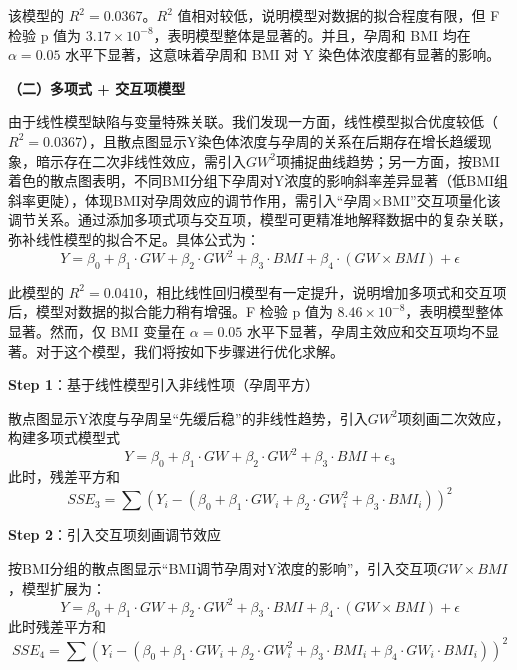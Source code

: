 \documentclass[withoutpreface,bwprint]{cumcmthesis} %
\begin{document}
该模型的 $R^2 = 0.0367$。$R^2$ 值相对较低，说明模型对数据的拟合程度有限，但 F 检验 p 值为 $3.17 \times 10^{-8}$，表明模型整体是显著的。并且，孕周和 BMI 均在 $\alpha = 0.05$ 水平下显著，这意味着孕周和 BMI 对 Y 染色体浓度都有显著的影响。

\textbf{（二）多项式 + 交互项模型}

由于线性模型缺陷与变量特殊关联。我们发现一方面，线性模型拟合优度较低（$R^2=0.0367$），且散点图显示Y染色体浓度与孕周的关系在后期存在增长趋缓现象，暗示存在二次非线性效应，需引入$GW^2$项捕捉曲线趋势；另一方面，按BMI着色的散点图表明，不同BMI分组下孕周对Y浓度的影响斜率差异显著（低BMI组斜率更陡），体现BMI对孕周效应的调节作用，需引入“孕周×BMI”交互项量化该调节关系。通过添加多项式项与交互项，模型可更精准地解释数据中的复杂关联，弥补线性模型的拟合不足。具体公式为：
\begin{equation}
    \label{eq:多项式 + 交互项模型}
    Y = \beta_0 + \beta_1 \cdot GW + \beta_2 \cdot GW^2 + \beta_3 \cdot BMI + \beta_4 \cdot (GW \times BMI) + \epsilon
\end{equation}


此模型的 $R^2 = 0.0410$，相比线性回归模型有一定提升，说明增加多项式和交互项后，模型对数据的拟合能力稍有增强。F 检验 p 值为 $8.46 \times 10^{-8}$，表明模型整体显著。然而，仅 BMI 变量在 $\alpha = 0.05$ 水平下显著，孕周主效应和交互项均不显著。对于这个模型，我们将按如下步骤进行优化求解。

\textbf{Step 1}：基于线性模型引入非线性项（孕周平方）

散点图显示Y浓度与孕周呈“先缓后稳”的非线性趋势，引入$GW^2$项刻画二次效应，构建多项式模型式
\begin{equation}
    Y = \beta_0 + \beta_1 \cdot GW + \beta_2 \cdot GW^2 + \beta_3 \cdot BMI + \epsilon_3
\end{equation}
此时，残差平方和
\begin{equation}
    SSE_3 = \sum (Y_i - (\beta_0 + \beta_1 \cdot GW_i + \beta_2 \cdot GW_i^2 + \beta_3 \cdot BMI_i))^2
\end{equation}


\textbf{Step 2}：引入交互项刻画调节效应

  按BMI分组的散点图显示“BMI调节孕周对Y浓度的影响”，引入交互项$GW \times BMI$，模型扩展为：
  \begin{equation}
    Y = \beta_0 + \beta_1 \cdot GW + \beta_2 \cdot GW^2 + \beta_3 \cdot BMI + \beta_4 \cdot (GW \times BMI) + \epsilon
  \end{equation} 
  此时残差平方和
  \begin{equation}
    SSE_4 = \sum (Y_i - (\beta_0 + \beta_1 \cdot GW_i + \beta_2 \cdot GW_i^2 + \beta_3 \cdot BMI_i + \beta_4 \cdot GW_i \cdot BMI_i))^2
  \end{equation}
\end{document}
